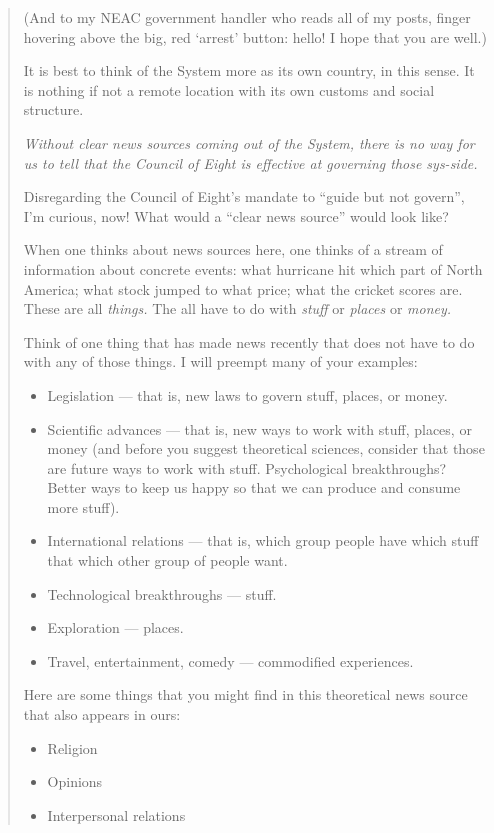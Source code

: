 \begin{quote}
(And to my NEAC government handler who reads all of my posts, finger hovering above the big, red `arrest' button: hello! I hope that you are well.)

It is best to think of the System more as its own country, in this sense. It is nothing if not a remote location with its own customs and social structure.

\emph{Without clear news sources coming out of the System, there is no way for us to tell that the Council of Eight is effective at governing those sys-side.}

Disregarding the Council of Eight's mandate to ``guide but not govern'', I'm curious, now! What would a ``clear news source'' would look like?

When one thinks about news sources here, one thinks of a stream of information about concrete events: what hurricane hit which part of North America; what stock jumped to what price; what the cricket scores are. These are all \emph{things.} The all have to do with \emph{stuff} or \emph{places} or \emph{money.}

Think of one thing that has made news recently that does not have to do with any of those things. I will preempt many of your examples:

\begin{itemize}
\tightlist
\item
  Legislation — that is, new laws to govern stuff, places, or money.
\item
  Scientific advances — that is, new ways to work with stuff, places, or money (and before you suggest theoretical sciences, consider that those are future ways to work with stuff. Psychological breakthroughs? Better ways to keep us happy so that we can produce and consume more stuff).
\item
  International relations — that is, which group people have which stuff that which other group of people want.
\item
  Technological breakthroughs — stuff.
\item
  Exploration — places.
\item
  Travel, entertainment, comedy — commodified experiences.
\end{itemize}

Here are some things that you might find in this theoretical news source that also appears in ours:

\begin{itemize}
\tightlist
\item
  Religion
\item
  Opinions
\item
  Interpersonal relations
\end{itemize}


\end{quote}
